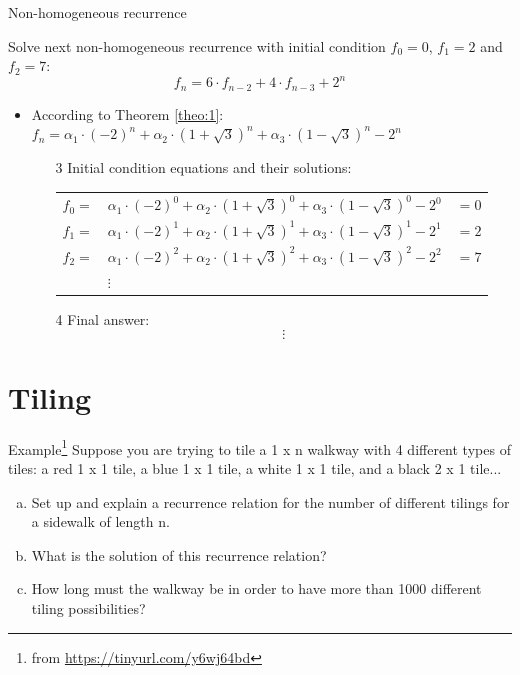 \documentclass{beamer}
\begin{document}
\begin{frame}{Non-homogeneous recurrence}

    {\small Solve next non-homogeneous recurrence with initial condition $f_0=0$, $f_1=2$ and $f_2=7$:
    \begin{equation}\tag{1}
        f_n = 6 \cdot f_{n-2} + 4 \cdot f_{n-3} + 2^n
    \end{equation} }
    \begin{itemize}
        \item According to Theorem \ref{theo:1}: 
            $ f_n = \alpha_1 \cdot (-2)^n + \alpha_2 \cdot (1+\sqrt{3})^n + \alpha_3 \cdot (1-\sqrt{3})^n - 2^n $
        \begin{enumerate}    
            \item[3] Initial condition equations and their solutions:
                \begin{tabular}{l l l}
                    $f_0 = $ & $\alpha_1 \cdot (-2)^0 + \alpha_2 \cdot (1+\sqrt{3})^0 + \alpha_3 \cdot (1-\sqrt{3})^0 - 2^0$ & $= 0$ \\ 
                    $f_1 = $ & $\alpha_1 \cdot (-2)^1 + \alpha_2 \cdot (1+\sqrt{3})^1 + \alpha_3 \cdot (1-\sqrt{3})^1 - 2^1$ & $= 2$ \\ 
                    $f_2 = $ & $\alpha_1 \cdot (-2)^2 + \alpha_2 \cdot (1+\sqrt{3})^2 + \alpha_3 \cdot (1-\sqrt{3})^2 - 2^2$ & $= 7$ \\
                             & $\vdots$                                                                                      &
                \end{tabular}
            \item[4] Final answer:
                $$ \vdots $$
        \end{enumerate}
    \end{itemize}
\end{frame}

\section{Tiling}

\begin{frame}{Example\footnote{from \url{https://tinyurl.com/y6wj64bd}}}
    Suppose you are trying to tile a 1 x n walkway with 4 different types of tiles: a red 1 x 1 tile, a blue 1 x 1 tile, a white 1 x 1 tile, and a black 2 x 1 tile...
    \begin{enumerate}[a)]
        \item Set up and explain a recurrence relation for the number of different tilings for a sidewalk of length n.
        \item What is the solution of this recurrence relation?
        \item How long must the walkway be in order to have more than 1000 different tiling possibilities? 
    \end{enumerate}
\end{frame}
\end{document}
